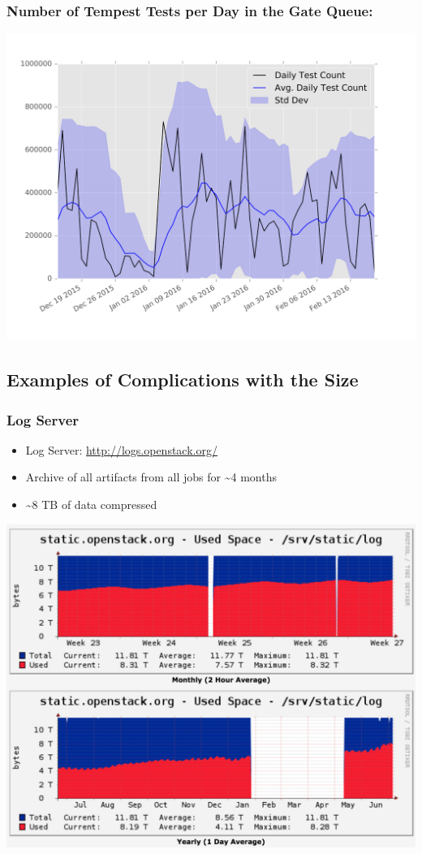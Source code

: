 \documentclass[aspectratio=43,11pt,hyperref={colorlinks=true}]{beamer}
\begin{document}
\begin{frame}
      \frametitle{Number of Tempest Tests per Day in the Gate Queue:}
    \begin{center}
      \includegraphics[width=1.0\textwidth]{tempest-gate-count.png}
  \end{center}
\end{frame}

\subsection{Examples of Complications with the Size}
\begin{frame}
  \frametitle{Log Server}
  \begin{itemize}
    \item Log Server: \href{http://logs.openstack.org/}{http://logs.openstack.org/}
    \item Archive of all artifacts from all jobs for \textasciitilde4 months
    \item \textasciitilde8 TB of data compressed
  \end{itemize}
  \begin{center}
    \includegraphics[width=.55\textwidth]{cacti-static-openstack-org-log-graph.png}
  \end{center}
\end{frame}
\end{document}
